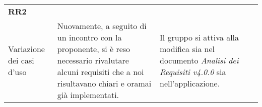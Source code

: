 \begin{longtable}{ 
		>{\centering}p{} 
		>{\raggedright}p{}
		>{\raggedright}p{} 
		>{\centering}p{}
	}
	\textbf{RR2} \\ Variazione dei casi d'uso & 
	Nuovamente, a seguito di un incontro con la proponente, si è reso necessario rivalutare alcuni requisiti che a noi risultavano chiari e oramai già implementati. &
	Il gruppo si attiva alla modifica sia nel documento \textit{Analisi dei Requisiti v4.0.0} sia nell'applicazione.
	\tabularnewline
	
	
\end{longtable}
\renewcommand{\arraystretch}{1}

